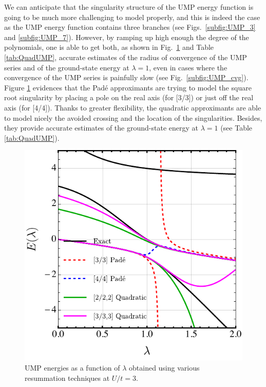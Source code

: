\documentclass[aps,prb,reprint,noshowkeys,linenumbers,superscriptaddress]{revtex4-1}
\begin{document}
We can anticipate that the singularity structure of the UMP energy function is going to be much more challenging to model properly, and this is indeed the case as the UMP energy function contains three branches (see Figs.~\ref{subfig:UMP_3} and \ref{subfig:UMP_7}).
However, by ramping up high enough the degree of the polynomials, one is able to get both, as shown in Fig.~\ref{fig:QuadUMP} and Table \ref{tab:QuadUMP}, accurate estimates of the radius of convergence of the UMP series and of the ground-state energy at $\lambda = 1$, even in cases where the convergence of the UMP series is painfully slow (see Fig.~\ref{subfig:UMP_cvg}).
Figure \ref{fig:QuadUMP} evidences that the Pad\'e approximants are trying to model the square root singularity by placing a pole on the real axis (for [3/3]) or just off the real axis (for [4/4]).
Thanks to greater flexibility, the quadratic approximants are able to model nicely the avoided crossing and the location of the singularities. 
Besides, they provide accurate estimates of the ground-state energy at $\lambda = 1$ (see Table \ref{tab:QuadUMP}).

\begin{figure}
    \includegraphics[width=\linewidth]{QuadUMP}
    \caption{\label{fig:QuadUMP}
    UMP energies as a function of $\lambda$ obtained using various resummation techniques at $U/t = 3$.}
\end{figure}
\end{document}
